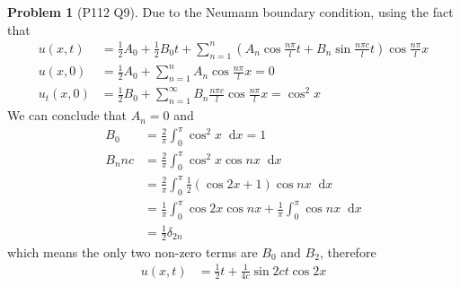 \documentclass[twoside,11pt]{article}
\renewcommand*\d{\mathop{}\!\mathrm{d}}
\theoremstyle{definition}
\newtheorem{problem}{Problem}
\theoremstyle{remark}
\begin{document}
\begin{problem}[P112 Q9]
Due to the Neumann boundary condition, using the fact that
\begin{align*}
    u(x, t) &= \frac{1}{2}A_0 + \frac{1}{2}B_0 t + 
    \sum_{n=1}^n \left(
        A_n\cos\frac{n\pi}{l}t + B_n\sin\frac{n\pi c}{l}t
    \right)\cos\frac{n\pi}{l}x\\
    u(x, 0) &= \frac{1}{2}A_0 + \sum_{n=1}^n A_n\cos\frac{n\pi}{l}x = 0\\
    u_t(x, 0) &= \frac{1}{2}B_0 + \sum_{n=1}^\infty B_n\frac{n\pi c}{l}\cos\frac{n\pi}{l}x
    =\cos^2 x
\end{align*}
We can conclude that $A_n=0$ and
\begin{align*}
    B_0 &= \frac{2}{\pi}\int_0^\pi \cos^2 x\d x = 1\\
    B_n nc &= \frac{2}{\pi}\int_0^\pi \cos^2 x \cos nx\d x \\
    &= \frac{2}{\pi}\int_0^\pi \frac{1}{2}(\cos 2x + 1)\cos nx \d x\\
    &= \frac{1}{\pi}\int_0^\pi \cos 2x \cos nx + \frac{1}{\pi}\int_0^\pi\cos nx \d x\\
    &= \frac{1}{2}\delta_{2n}
\end{align*}
which means the only two non-zero terms are $B_0$ and $B_2$, therefore
\begin{align*}
    u(x,t) &= \frac{1}{2}t + \frac{1}{4c}\sin 2ct\cos 2x
\end{align*}

\end{problem}



\end{document}
